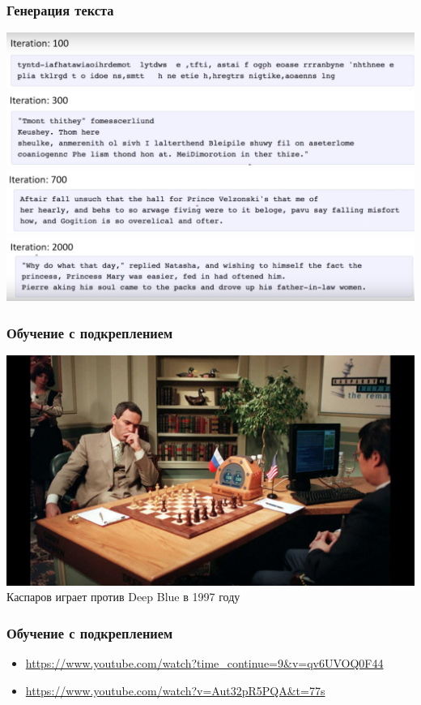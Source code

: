 \documentclass[aspectratio=169,newPxFont]{beamer}
\begin{document}
\begin{frame}
	\frametitle{Генерация текста}
	\centering \includegraphics[width=0.7\linewidth]{t1.png}\\
	\centering \includegraphics[width=0.7\linewidth]{t2.png}\\
	\centering \includegraphics[width=0.7\linewidth]{t3.png}\\
	\centering \includegraphics[width=0.7\linewidth]{t4.png}\\
\end{frame}

\begin{frame}
	\frametitle{Обучение с подкреплением}
	\centering \includegraphics[width=0.7\linewidth]{chess.jpg}\\
	Каспаров играет против Deep Blue в 1997 году
\end{frame}


\begin{frame}
	\frametitle{Обучение с подкреплением}
	\begin{itemize}
	\item \url{https://www.youtube.com/watch?time_continue=9&v=qv6UVOQ0F44}
	\item \url{https://www.youtube.com/watch?v=Aut32pR5PQA&t=77s} 

	\end{itemize}
\end{frame}
\end{document}
